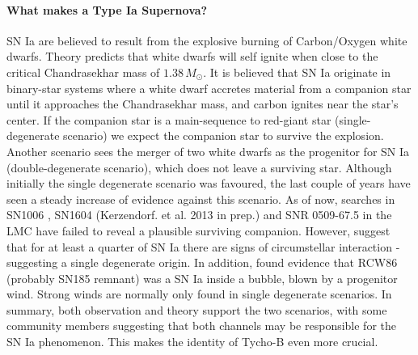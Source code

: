 \documentclass[12pt]{article}
\begin{document}
\vspace{-5mm}
\paragraph{What makes a Type Ia Supernova?}
SN Ia are believed to result from the explosive burning of Carbon/Oxygen white dwarfs. Theory predicts that white dwarfs will self ignite when close to the critical Chandrasekhar mass of  $1.38\,M_\odot$. 
It is believed that SN Ia originate in binary-star systems where a white dwarf accretes material from a companion star until it approaches the Chandrasekhar mass, and carbon ignites near the star's center. If the companion star is a main-sequence to red-giant star (single-degenerate scenario) we expect the companion star to survive the explosion. Another scenario sees the merger of two white dwarfs as the progenitor for SN Ia (double-degenerate scenario), which does not leave a surviving star. 
Although initially the single degenerate scenario was favoured, the last couple of years have seen a steady increase of evidence against this scenario. As of now, searches in SN1006 \citep{2012Natur.489..533G,2012ApJ...759....7K}, SN1604 (Kerzendorf. et al. 2013 in prep.) and SNR 0509-67.5 in the LMC \citep{2012Natur.481..164S} have failed to reveal a plausible surviving companion. However, \citet{2011Sci...333..856S, 2007Sci...317..924P, 2012arXiv1203.2916F} suggest that for at least a quarter of SN Ia there are signs of circumstellar interaction - suggesting a single degenerate origin. In addition,  \cite{2011ApJ...741...96W} found evidence that  RCW86 (probably SN185 remnant) was a SN Ia inside a bubble, blown by a progenitor wind. Strong winds are normally only found in single degenerate scenarios. In summary, both observation and theory support the two scenarios, with some community members suggesting that both channels may be responsible for the SN Ia phenomenon. This makes the identity of Tycho-B even more crucial.


\vspace{-5mm}
\end{document}
